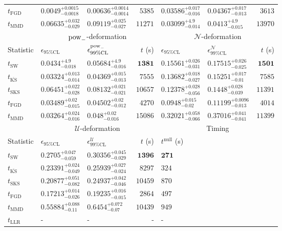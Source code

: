 \begin{tabular}{l|llr|llr}
	$t_{\mathrm{FGD}}$ & ${\mathbf{0.0049_{-0.0018}^{+0.0015}}}$ & ${\mathbf{0.00636_{-0.0014}^{+0.0014}}}$ & $5385$ & $0.03586_{-0.016}^{+0.017}$ & $0.04367_{-0.013}^{+0.017}$ & $3613$ \\
	$t_{\mathrm{MMD}}$ & $0.06635_{-0.029}^{+0.032}$ & $0.09119_{-0.027}^{+0.025}$ & $11271$ & ${\mathbf{0.03099_{-0.014}^{+4.9}}}$ & ${\mathbf{0.0413_{-0.015}^{+4.9}}}$ & $13970$ \\
	\toprule
	\multicolumn{1}{c}{} & \multicolumn{3}{c}{$\rm{pow}_{-}$-deformation} & \multicolumn{3}{c}{$\mathcal{N}$-deformation} \\
	Statistic & $\epsilon_{95\%\mathrm{CL}}$ & $\epsilon^  {\rm{pow}_{-}}_{99\%\mathrm{CL}}$ & $t$ (s) & $\epsilon_{95\%\mathrm{CL}}$ & $\epsilon^    {\mathcal{N}}_{99\%\mathrm{CL}}$ & $t$ (s) \\
	\midrule
	$t_{\mathrm{SW}}$ & $0.0434_{-0.018}^{+4.9}$ & $0.05684_{-0.016}^{+4.9}$ & ${\mathbf{1381}}$ & $0.15561_{-0.031}^{+0.026}$ & $0.17515_{-0.025}^{+0.026}$ & ${\mathbf{1501}}$ \\
	$t_{\overline{\mathrm{KS}}}$ & $0.03324_{-0.014}^{+0.013}$ & ${\mathbf{0.04369_{-0.013}^{+0.015}}}$ & $7555$ & $0.13682_{-0.027}^{+0.018}$ & $0.15251_{-0.01}^{+0.017}$ & $7585$ \\
	$t_{\mathrm{SKS}}$ & $0.06451_{-0.028}^{+0.022}$ & $0.08132_{-0.021}^{+0.021}$ & $10657$ & $0.12378_{-0.056}^{+0.028}$ & $0.1448_{-0.039}^{+0.028}$ & $11391$ \\
	$t_{\mathrm{FGD}}$ & $0.03489_{-0.015}^{+0.02}$ & $0.04502_{-0.012}^{+0.02}$ & $4270$ & ${\mathbf{0.0948_{-0.02}^{+0.015}}}$ & ${\mathbf{0.11199_{-0.013}^{+0.0096}}}$ & $4014$ \\
	$t_{\mathrm{MMD}}$ & ${\mathbf{0.03264_{-0.016}^{+0.024}}}$ & $0.048_{-0.016}^{+0.02}$ & $15086$ & $0.32021_{-0.066}^{+0.058}$ & $0.37016_{-0.041}^{+0.041}$ & $11399$ \\
	\toprule
	\multicolumn{1}{c}{} & \multicolumn{3}{c}{$\mathcal{U}$-deformation} & \multicolumn{3}{c}{Timing} \\
	Statistic & $\epsilon_{95\%\mathrm{CL}}$ & $\epsilon^    {\mathcal{U}}_{99\%\mathrm{CL}}$ & $t$ (s) & $t^{\mathrm{null}}$ (s) \\
	\midrule
	$t_{\mathrm{SW}}$ & $0.2705_{-0.059}^{+0.047}$ & $0.30356_{-0.029}^{+0.045}$ & ${\mathbf{1396}}$ & ${\mathbf{271}}$ \\
	$t_{\overline{\mathrm{KS}}}$ & $0.23391_{-0.049}^{+0.024}$ & $0.25939_{-0.024}^{+0.027}$ & $8297$ & $324$ \\
	$t_{\mathrm{SKS}}$ & $0.20877_{-0.082}^{+0.051}$ & $0.24937_{-0.046}^{+0.042}$ & $10459$ & $870$ \\
	$t_{\mathrm{FGD}}$ & ${\mathbf{0.17213_{-0.026}^{+0.014}}}$ & ${\mathbf{0.19235_{-0.015}^{+0.016}}}$ & $2864$ & $497$ \\
	$t_{\mathrm{MMD}}$ & $0.55884_{-0.11}^{+0.088}$ & $0.6454_{-0.07}^{+0.072}$ & $10439$ & $949$ \\
	$t_{\mathrm{LLR}}$ & - & - & - & - \\
	\bottomrule
\end{tabular}